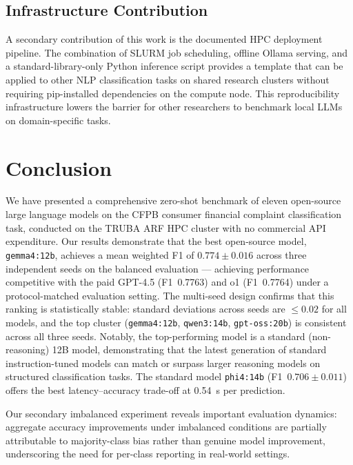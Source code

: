 \documentclass[a4paper,fleqn]{cas-dc}
\begin{document}
\subsection{Infrastructure Contribution}

A secondary contribution of this work is the documented HPC
deployment pipeline. The combination of SLURM job scheduling,
offline Ollama serving, and a standard-library-only Python inference
script provides a template that can be applied to other NLP
classification tasks on shared research clusters without requiring
pip-installed dependencies on the compute node. This reproducibility
infrastructure lowers the barrier for other researchers to benchmark
local LLMs on domain-specific tasks.


\section{Conclusion}
\label{sec:conclusion}

We have presented a comprehensive zero-shot benchmark of eleven
open-source large language models on the CFPB consumer financial
complaint classification task, conducted on the TRUBA ARF HPC cluster
with no commercial API expenditure. Our results demonstrate that the
best open-source model, \texttt{gemma4:12b}, achieves a mean weighted
F1 of $0.774 \pm 0.016$ across three independent seeds on the balanced
evaluation --- achieving performance competitive with the paid GPT-4.5
(F1~0.7763) and o1 (F1~0.7764) under a protocol-matched evaluation
setting. The multi-seed design confirms that
this ranking is statistically stable: standard deviations across seeds
are $\leq 0.02$ for all models, and the top cluster
(\texttt{gemma4:12b}, \texttt{qwen3:14b}, \texttt{gpt-oss:20b})
is consistent across all three seeds. Notably, the top-performing
model is a standard (non-reasoning) 12B model, demonstrating that
the latest generation of standard instruction-tuned models can match
or surpass larger reasoning models on structured classification tasks.
The standard model \texttt{phi4:14b} (F1~$0.706 \pm 0.011$)
offers the best latency--accuracy trade-off at 0.54~s per prediction.

Our secondary imbalanced experiment reveals important evaluation
dynamics: aggregate accuracy improvements under imbalanced
conditions are partially attributable to majority-class bias
rather than genuine model improvement, underscoring the need for
per-class reporting in real-world settings.
\end{document}

